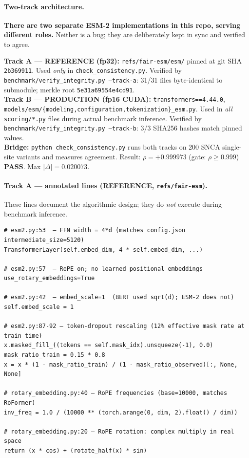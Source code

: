 \documentclass[11pt,a4paper]{article}
\begin{document}
\paragraph{Two-track architecture.}
\textbf{There are two separate ESM-2 implementations in this repo, serving different roles.}
Neither is a bug; they are deliberately kept in sync and verified to agree.

\begin{integritybox}
\textbf{Track A — REFERENCE (fp32):} \texttt{refs/fair-esm/esm/} pinned at git SHA
\texttt{2b369911}.  Used \emph{only} in \texttt{check\_consistency.py}.
Verified by \texttt{benchmark/verify\_integrity.py --track-a}: 31/31 files byte-identical
to submodule; merkle root \texttt{5e31a69554e4cd91}.\\[4pt]
\textbf{Track B — PRODUCTION (fp16 CUDA):} \texttt{transformers==4.44.0},
\texttt{models/esm/\{modeling,configuration,tokenization\}\_esm.py}.
Used in \emph{all} \texttt{scoring/*.py} files during actual benchmark inference.
Verified by \texttt{benchmark/verify\_integrity.py --track-b}: 3/3 SHA256 hashes match pinned values.\\[4pt]
\textbf{Bridge:} \texttt{python check\_consistency.py} runs both tracks on 200 SNCA
single-site variants and measures agreement.
Result: $\rho = +0.999973$ (gate: $\rho \geq 0.999$) \textbf{PASS}. Max $|\Delta| = 0.020073$.
\end{integritybox}

\paragraph{Track A — annotated lines (REFERENCE, \texttt{refs/fair-esm}).}
These lines document the algorithmic design; they do \emph{not} execute during benchmark inference.

\begin{lstlisting}[style=python,caption={%
  Track A: \texttt{refs/fair-esm/esm/model/esm2.py} and
  \texttt{refs/fair-esm/esm/rotary\_embedding.py}.
  Verified clean by \texttt{benchmark/verify\_integrity.py --track-a}.
}]
# esm2.py:53  — FFN width = 4*d (matches config.json intermediate_size=5120)
TransformerLayer(self.embed_dim, 4 * self.embed_dim, ...)

# esm2.py:57  — RoPE on; no learned positional embeddings
use_rotary_embeddings=True

# esm2.py:42  — embed_scale=1  (BERT used sqrt(d); ESM-2 does not)
self.embed_scale = 1

# esm2.py:87-92 — token-dropout rescaling (12% effective mask rate at train time)
x.masked_fill_((tokens == self.mask_idx).unsqueeze(-1), 0.0)
mask_ratio_train = 0.15 * 0.8
x = x * (1 - mask_ratio_train) / (1 - mask_ratio_observed)[:, None, None]

# rotary_embedding.py:40 — RoPE frequencies (base=10000, matches RoFormer)
inv_freq = 1.0 / (10000 ** (torch.arange(0, dim, 2).float() / dim))

# rotary_embedding.py:20 — RoPE rotation: complex multiply in real space
return (x * cos) + (rotate_half(x) * sin)
\end{lstlisting}
\end{document}
